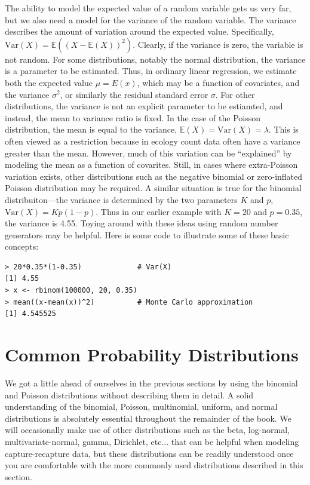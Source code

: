 The ability to model the expected value of a random variable gets us
very far, but we also need a model for the variance of the random
variable. The variance %
describes the amount of variation around the expected
value. Specifically, $\text{Var}(X) = \mathbb{E}((X -
\mathbb{E}(X))^2)$. Clearly, if the variance is zero, the variable is
not random.
For some distributions, notably the normal distribution, the variance
is a parameter to be estimated. Thus, in ordinary linear regression,
we estimate both the expected value $\mu=E(x)$,
which may be a function of covariates, and the variance
$\sigma^2$, or similarly the residual standard error $\sigma$. For
other distributions, the variance is not an explicit parameter to be
estiamted, and instead, the mean to variance ratio is fixed. In the
case of the Poisson distribution, the mean is equal to the
variance, $\mathbb{E}(X) = \text{Var}(X) = \lambda$. This is often viewed as a restriction because in ecology
count data often have a variance greater than the mean. However, much
of this variation can be ``explained'' by modeling the mean as a
function of covarites. Still, in cases where extra-Poisson variation
exists, other distributions such as the negative binomial or
zero-inflated Poisson distribution may be required. A similar
situation is true for the binomial distribuiton---the variance is
determined by the two parameters $K$ and $p$, $\text{Var}(X) = Kp(1-p)$. Thus
in our earlier example with $K=20$ and $p=0.35$, the variance is
4.55. Toying around with these ideas using random number generators
may be helpful. Here is some code to illustrate some of these basic concepts:
\begin{verbatim}
> 20*0.35*(1-0.35)             # Var(X)
[1] 4.55
> x <- rbinom(100000, 20, 0.35)
> mean((x-mean(x))^2)          # Monte Carlo approximation
[1] 4.545525
\end{verbatim}



\section{Common Probability Distributions}
\label{sec.modeling.distributions}

We got a little ahead of ourselves in the previous sections by using
the binomial and Poisson distributions without describing them in detail.
A solid understanding of the binomial, Poisson, multinomial, uniform,
and normal distributions is absolutely essential throughout the
remainder of the book. We will occasionally make use of other
distributions such as the beta, log-normal, multivariate-normal,
gamma, Dirichlet, etc... that can be helpful when
modeling capture-recapture data, but these distributions can be
readily understood once you are comfortable with the more commonly
used distributions described in this section.

